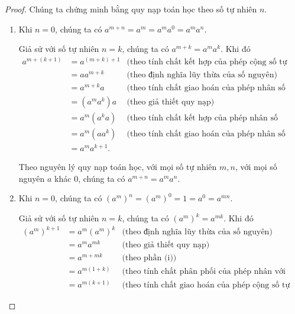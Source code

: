 \begin{proof}
    Chúng ta chứng minh bằng quy nạp toán học theo số tự nhiên $n$.
    \begin{enumerate}[topsep=0pt,itemsep=0pt,label={(\roman*)}]
        \item Khi $n = 0$, chúng ta có $a^{m+n} = a^{m} = a^{m}a^{0} = a^{m}a^{n}$.

              Giả sử với số tự nhiên $n = k$, chúng ta có $a^{m + k} = a^{m}a^{k}$. Khi đó
              \begin{align*}
                  a^{m + (k + 1)} & = a^{(m + k) + 1} & \text{(theo tính chất kết hợp của phép cộng số tự nhiên)} \\
                                  & = aa^{m + k}      & \text{(theo định nghĩa lũy thừa của số nguyên)}           \\
                                  & = a^{m+k}a        & \text{(theo tính chất giao hoán của phép nhân số nguyên)} \\
                                  & = (a^{m}a^{k})a   & \text{(theo giả thiết quy nạp)}                           \\
                                  & = a^{m}(a^{k}a)   & \text{(theo tính chất kết hợp của phép nhân số nguyên)}   \\
                                  & = a^{m}(aa^{k})   & \text{(theo tính chất giao hoán của phép nhân số nguyên)} \\
                                  & = a^{m}a^{k+1}.
              \end{align*}

              Theo nguyên lý quy nạp toán học, với mọi số tự nhiên $m, n$, với mọi số nguyên $a$ khác $0$, chúng ta có $a^{m + n} = a^{m}a^{n}$.
        \item Khi $n = 0$, chúng ta có ${(a^{m})}^{n} = {(a^{m})}^{0} = 1 = a^{0} = a^{mn}$.

              Giả sử với số tự nhiên $n = k$, chúng ta có ${(a^{m})}^{k} = a^{mk}$. Khi đó
              \begin{align*}
                  {(a^{m})}^{k+1} & = a^{m}{(a^{m})}^{k} & \text{(theo định nghĩa lũy thừa của số nguyên)}                           \\
                                  & = a^{m}a^{mk}        & \text{(theo giả thiết quy nạp)}                                           \\
                                  & = a^{m + mk}         & \text{(theo phần (i))}                                                    \\
                                  & = a^{m(1 + k)}       & \text{(theo tính chất phân phối của phép nhân với phép cộng số tự nhiên)} \\
                                  & = a^{m(k+1)}         & \text{(theo tính chất giao hoán của phép cộng số tự nhiên)}
              \end{align*}


\end{enumerate}
\end{proof}
